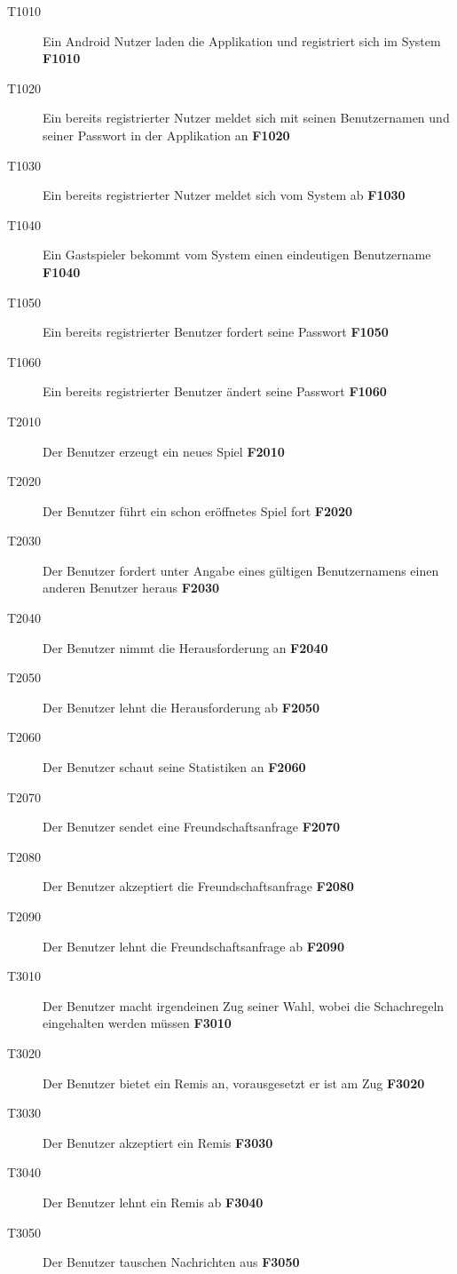 \documentclass[parskip=full]{scrartcl}
\begin{document}
\begin{description}
	\item[T1010] Ein Android Nutzer laden die Applikation und registriert sich im System \textbf{F1010}
	\item[T1020] Ein bereits registrierter Nutzer meldet sich mit seinen Benutzernamen und seiner Passwort in der Applikation an \textbf{F1020}
	\item[T1030] Ein bereits registrierter Nutzer meldet sich vom System ab \textbf{F1030}
	\item[T1040] Ein Gastspieler bekommt vom System einen eindeutigen Benutzername \textbf{F1040}
	\item[T1050] Ein bereits registrierter Benutzer fordert seine Passwort \textbf{F1050}
	\item[T1060] Ein bereits registrierter Benutzer ändert seine Passwort \textbf{F1060}
	\item[T2010] Der Benutzer erzeugt ein neues Spiel \textbf{F2010}
	\item[T2020] Der Benutzer führt ein schon eröffnetes Spiel fort \textbf{F2020}
	\item[T2030] Der Benutzer fordert unter Angabe eines gültigen Benutzernamens einen anderen Benutzer heraus \textbf{F2030}
	\item[T2040] Der Benutzer nimmt die Herausforderung an \textbf{F2040}
	\item[T2050] Der Benutzer lehnt die Herausforderung ab \textbf{F2050}
	\item[T2060] Der Benutzer schaut seine Statistiken an \textbf{F2060}
	\item[T2070] Der Benutzer sendet eine Freundschaftsanfrage \textbf{F2070}
	\item[T2080] Der Benutzer akzeptiert die Freundschaftsanfrage \textbf{F2080}
	\item[T2090] Der Benutzer lehnt die Freundschaftsanfrage ab \textbf{F2090}
	\item[T3010] Der Benutzer macht irgendeinen Zug seiner Wahl, wobei die Schachregeln eingehalten werden müssen \textbf{F3010}
	\item[T3020] Der Benutzer bietet ein Remis an, vorausgesetzt er ist am Zug \textbf{F3020}
	\item[T3030] Der Benutzer akzeptiert ein Remis \textbf{F3030}
	\item[T3040] Der Benutzer lehnt ein Remis ab \textbf{F3040}
	\item[T3050] Der Benutzer tauschen Nachrichten aus \textbf{F3050}
	
\end{description}
\end{document}
